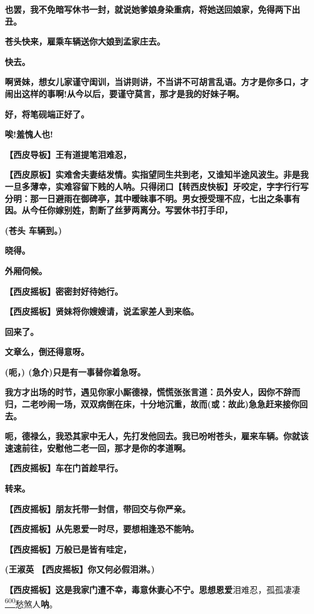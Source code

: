 \textbf{也罢，我不免暗写休书一封，就说她爹娘身染重病，将她送回娘家，免得两下出丑。}

\textbf{苍头快来，雇乘车辆送你大娘到孟家庄去。}

\textbf{快去。}

\textbf{啊贤妹，想女儿家谨守闺训，当讲则讲，不当讲不可胡言乱语。方才是你多口，才闹出这样的事啊!从今以后，要谨守莫言，那才是我的好妹子啊。}

\textbf{好，将笔砚端正好了。}

\textbf{唉!羞愧人也!}

\textbf{【西皮导板】王有道提笔泪难忍，}

\textbf{【西皮原板】实难舍夫妻结发情。实指望同生共到老，又谁知半途风波生。非是我一旦多薄幸，实难容留下贱的人呐。只得闭口【转西皮快板】牙咬定，字字行行写分明：那一日避雨在御碑亭，其中暧昧事不明。男女授受理不应，七出之条事有因。从今任你嫁别姓，割断了丝萝两离分。写罢休书打手印，}

\textbf{(苍头 车辆到。)}

\textbf{晓得。}

\textbf{外厢伺候。}

\textbf{【西皮摇板】密密封好待她行。}

\textbf{【西皮摇板】贤妹将你嫂嫂请，说孟家差人到来临。}

\textbf{回来了。}

\textbf{文章么，倒还得意呀。}

\textbf{(呃，) (急介)只是有一事替你着急呀。}

\textbf{我方才出场的时节，遇见你家小厮德禄，慌慌张张言道：员外安人，因你不辞而归，二老吵闹一场，双双病倒在床，十分地沉重，故而(或：故此)急急赶来接你回去。}

\textbf{呃，德禄么，我恐其家中无人，先打发他回去。我已吩咐苍头，雇来车辆。你就该速速前往，安慰他二老一回，那才是你的孝道啊。}

\textbf{【西皮摇板】车在门首趁早行。}

\textbf{转来。}

\textbf{【西皮摇板】朋友托带一封信，带回交与你严亲。}

\textbf{【西皮摇板】从先恩爱一时尽，要想相逢恐不能呐。}

\textbf{【西皮摇板】万般已是皆有哇定，}

\textbf{(王淑英 【西皮摇板】你又何必假泪淋。)}

\textbf{【西皮摇板】这是我家门遭不幸，毒意休妻心不宁。思想恩爱}泪难忍，孤孤凄凄\protect\hyperlink{fn600}{\textsuperscript{600}}愁煞人\textbf{呐}。

